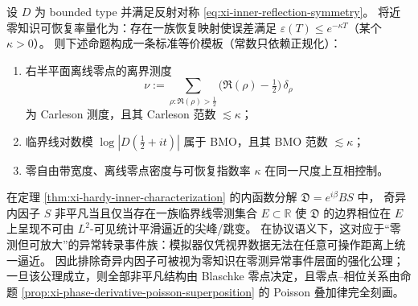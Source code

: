\begin{theorem}\label{thm:xi-carleson-bmo-recovery-template}
设 \(D\) 为 bounded type 并满足反射对称 \eqref{eq:xi-inner-reflection-symmetry}。
将近零知识可恢复率量化为：存在一族恢复映射使误差满足 \(\varepsilon(T)\le e^{-\kappa T}\)（某个 \(\kappa>0\)）。
则下述命题构成一条标准等价模板（常数只依赖正规化）：
\begin{enumerate}
  \item 右半平面离线零点的离界测度
  \[
  \nu:=\sum_{\rho:\Re(\rho)>\frac12}\bigl(\Re(\rho)-\tfrac12\bigr)\,\delta_{\rho}
  \]
  为 Carleson 测度，且其 Carleson 范数 \(\lesssim \kappa\)；
  \item 临界线对数模 \(\log|D(\tfrac12+it)|\) 属于 BMO，且其 BMO 范数 \(\lesssim \kappa\)；
  \item 零自由带宽度、离线零点密度与可恢复指数率 \(\kappa\) 在同一尺度上互相控制。
\end{enumerate}
\end{theorem}

\begin{remark}\label{rem:xi-singular-inner-factor-information-spikes}
在定理 \ref{thm:xi-hardy-inner-characterization} 的内函数分解 \(\mathfrak{D}=e^{i\beta}BS\) 中，
奇异内因子 \(S\) 非平凡当且仅当存在一族临界线零测集合 \(E\subset\mathbb{R}\) 使 \(\mathfrak{D}\) 的边界相位在 \(E\) 上呈现不可由 \(L^2\)-可见统计平滑逼近的尖峰/跳变。
在协议语义下，这对应于“零测但可放大”的异常转录事件族：模拟器仅凭视界数据无法在任意可操作距离上统一逼近。
因此排除奇异内因子可被视为零知识在零测异常事件层面的强化公理；一旦该公理成立，则全部非平凡结构由 Blaschke 零点决定，且零点–相位关系由命题 \ref{prop:xi-phase-derivative-poisson-superposition} 的 Poisson 叠加律完全刻画。
\end{remark}

